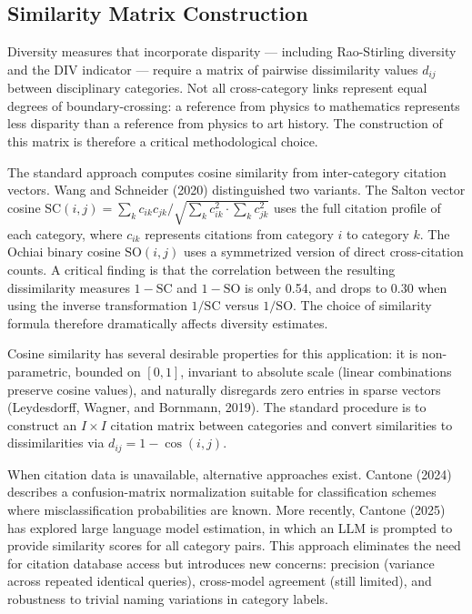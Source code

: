 \documentclass[
]{article}
\begin{document}
\hypertarget{similarity-matrix-construction}{%
\subsection{Similarity Matrix
Construction}\label{similarity-matrix-construction}}

Diversity measures that incorporate disparity --- including Rao-Stirling
diversity and the DIV indicator --- require a matrix of pairwise
dissimilarity values \(d_{ij}\) between disciplinary categories. Not all
cross-category links represent equal degrees of boundary-crossing: a
reference from physics to mathematics represents less disparity than a
reference from physics to art history. The construction of this matrix
is therefore a critical methodological choice.

The standard approach computes cosine similarity from inter-category
citation vectors. Wang and Schneider (2020) distinguished two variants.
The Salton vector cosine
\(\text{SC}(i,j) = \sum_k c_{ik} c_{jk} / \sqrt{\sum_k c_{ik}^2 \cdot \sum_k c_{jk}^2}\)
uses the full citation profile of each category, where \(c_{ik}\)
represents citations from category \(i\) to category \(k\). The Ochiai
binary cosine \(\text{SO}(i,j)\) uses a symmetrized version of direct
cross-citation counts. A critical finding is that the correlation
between the resulting dissimilarity measures \(1 - \text{SC}\) and
\(1 - \text{SO}\) is only 0.54, and drops to 0.30 when using the inverse
transformation \(1/\text{SC}\) versus \(1/\text{SO}\). The choice of
similarity formula therefore dramatically affects diversity estimates.

Cosine similarity has several desirable properties for this application:
it is non-parametric, bounded on \([0,1]\), invariant to absolute scale
(linear combinations preserve cosine values), and naturally disregards
zero entries in sparse vectors (Leydesdorff, Wagner, and Bornmann,
2019). The standard procedure is to construct an \(I \times I\) citation
matrix between categories and convert similarities to dissimilarities
via \(d_{ij} = 1 - \cos(i,j)\).

When citation data is unavailable, alternative approaches exist. Cantone
(2024) describes a confusion-matrix normalization suitable for
classification schemes where misclassification probabilities are known.
More recently, Cantone (2025) has explored large language model
estimation, in which an LLM is prompted to provide similarity scores for
all category pairs. This approach eliminates the need for citation
database access but introduces new concerns: precision (variance across
repeated identical queries), cross-model agreement (still limited), and
robustness to trivial naming variations in category labels.
\end{document}
